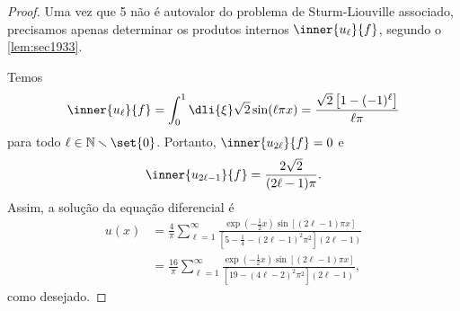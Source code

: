 \begin{proof}
    Uma vez que 5 não é autovalor do problema de Sturm-Liouville associado, precisamos apenas determinar os produtos internos \(\inner{u_\ell}{f}\), segundo o \cref{lem:sec1933}.

    Temos
    \begin{equation*}
        \inner{u_\ell}{f} = \int_0^1 \dli{\xi} \sqrt{2} \sin(\ell\pi x) = \frac{\sqrt{2}\left[1 - (-1)^\ell\right]}{\ell \pi}
    \end{equation*}
    para todo \(\ell \in \mathbb{N} \smallsetminus\set{0}\). Portanto, \(\inner{u_{2\ell}}{f} = 0\) e
    \begin{equation*}
        \inner{u_{2\ell-1}}{f} = \frac{2\sqrt{2}}{(2\ell - 1)\pi}.
    \end{equation*}
    Assim, a solução da equação diferencial é
    \begin{align*}
        u(x) &= \frac{4}{\pi} \sum_{\ell = 1}^\infty \frac{\exp\left(-\frac12x\right)\sin\left[(2\ell - 1)\pi x\right]}{[5 - \frac{1}{4} - (2\ell - 1)^2\pi^2](2\ell - 1)}\\
             &= \frac{16}{\pi} \sum_{\ell = 1}^\infty \frac{\exp\left(-\frac12x\right)\sin\left[(2\ell - 1)\pi x\right]}{[19 - (4\ell - 2)^2\pi^2](2\ell - 1)},
    \end{align*}
    como desejado.
\end{proof}
